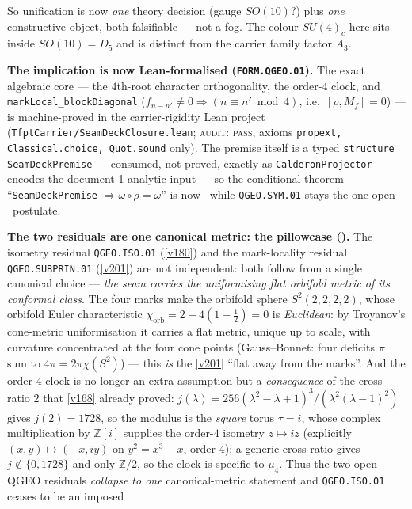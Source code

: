 \documentclass[11pt,a4paper]{article}
\newcommand{\Z}{\mathbb Z}
\begin{document}
\begin{keybox}
So
unification is now \emph{one} theory decision (gauge $SO(10)$?) plus \emph{one} constructive object, both
falsifiable --- not a fog. The colour $SU(4)_c$ here sits inside $SO(10){=}D_5$ and is distinct from the
carrier family factor $A_3$.
\par\smallskip\noindent\textbf{The implication is now Lean-formalised (\texttt{FORM.QGEO.01}).} The exact
algebraic core --- the $4$th-root character orthogonality, the order-$4$ clock, and
\texttt{markLocal\_blockDiagonal} ($f_{n-n'}\neq0\Rightarrow(n\equiv n'\bmod4)$, i.e.\ $[\rho,M_f]=0$) ---
is machine-proved in the carrier-rigidity Lean project (\texttt{TfptCarrier/SeamDeckClosure.lean};
\textsc{audit: pass}, axioms \texttt{propext, Classical.choice, Quot.sound} only). The premise itself is a
typed \texttt{structure} \texttt{SeamDeckPremise} --- consumed, not proved, exactly as
\texttt{CalderonProjector} encodes the document-1 analytic input --- so the conditional theorem
``\texttt{SeamDeckPremise} $\Rightarrow\omega\circ\rho=\omega$'' is now \mE\ while
\texttt{QGEO.SYM.01} stays the one open \mO\ postulate.
\par\smallskip\noindent\textbf{The two residuals are one canonical metric: the pillowcase
().} The isometry residual \texttt{QGEO.ISO.01} (\vref{v180}) and the
mark-locality residual \texttt{QGEO.SUBPRIN.01} (\vref{v201}) are not independent: both follow from a
single canonical choice --- \emph{the seam carries the uniformising flat orbifold metric of its conformal
class}. The four marks make the orbifold sphere $S^2(2,2,2,2)$, whose orbifold Euler characteristic
$\chi_{\mathrm{orb}}=2-4(1-\tfrac12)=0$ is \emph{Euclidean}: by Troyanov's cone-metric uniformisation it
carries a flat metric, unique up to scale, with curvature concentrated at the four cone points
(Gauss--Bonnet: four deficits $\pi$ sum to $4\pi=2\pi\chi(S^2)$) --- this \emph{is} the \vref{v201}
``flat away from the marks''. And the order-$4$ clock is no longer an extra assumption but a
\emph{consequence} of the cross-ratio $2$ that \vref{v168} already proved:
$j(\lambda)=256(\lambda^2-\lambda+1)^3/(\lambda^2(\lambda-1)^2)$ gives $j(2)=1728$, so the modulus is the
\emph{square} torus $\tau=i$, whose complex multiplication by $\Z[i]$ supplies the order-$4$ isometry
$z\mapsto iz$ (explicitly $(x,y)\mapsto(-x,iy)$ on $y^2=x^3-x$, order $4$); a generic cross-ratio gives
$j\notin\{0,1728\}$ and only $\Z/2$, so the clock is specific to $\mu_4$. Thus the two open QGEO residuals
\emph{collapse to one} canonical-metric statement and \texttt{QGEO.ISO.01} ceases to be an imposed

\end{keybox}
\end{document}
